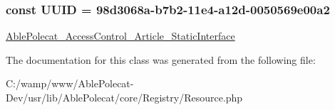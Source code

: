 \subsubsection[{U\+U\+I\+D}]{\setlength{\rightskip}{0pt plus 5cm}const U\+U\+I\+D = \textquotesingle{}98d3068a-\/b7b2-\/11e4-\/a12d-\/0050569e00a2\textquotesingle{}}\label{class_able_polecat___registry___resource_a74b892c8c0b86bf9d04c5819898c51e7}
\hyperlink{interface_able_polecat___access_control___article___static_interface}{Able\+Polecat\+\_\+\+Access\+Control\+\_\+\+Article\+\_\+\+Static\+Interface} 

The documentation for this class was generated from the following file\+:\begin{DoxyCompactItemize}
\item 
C\+:/wamp/www/\+Able\+Polecat-\/\+Dev/usr/lib/\+Able\+Polecat/core/\+Registry/Resource.\+php\end{DoxyCompactItemize}
